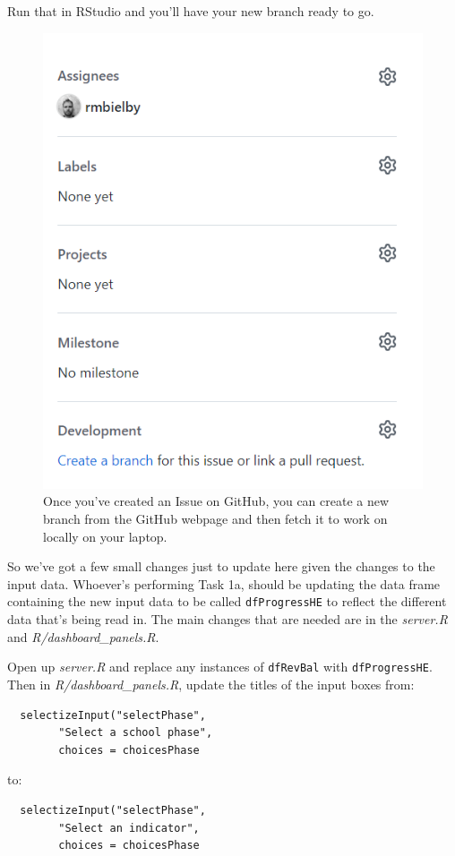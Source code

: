 \documentclass[
  12pt,
]{article}
\begin{document}
Run that in RStudio and you'll have your new branch ready to go.

\begin{figure}

{\centering \includegraphics[width=0.64\linewidth]{images/gitdemo/gitdemo-GitHub-Issues-NewBranch} 

}

\caption{Once you've created an Issue on GitHub, you can create a new branch from the GitHub webpage and then fetch it to work on locally on your laptop.}\label{fig:unnamed-chunk-11}
\end{figure}

So we've got a few small changes just to update here given the changes
to the input data. Whoever's performing Task 1a, should be updating the
data frame containing the new input data to be called
\texttt{dfProgressHE} to reflect the different data that's being read
in. The main changes that are needed are in the \emph{server.R} and
\emph{R/dashboard\_panels.R}.

Open up \emph{server.R} and replace any instances of \texttt{dfRevBal}
with \texttt{dfProgressHE}. Then in \emph{R/dashboard\_panels.R}, update
the titles of the input boxes from:

\begin{verbatim}
  selectizeInput("selectPhase",
        "Select a school phase",
        choices = choicesPhase
\end{verbatim}

to:

\begin{verbatim}
  selectizeInput("selectPhase",
        "Select an indicator",
        choices = choicesPhase
\end{verbatim}
\end{document}
